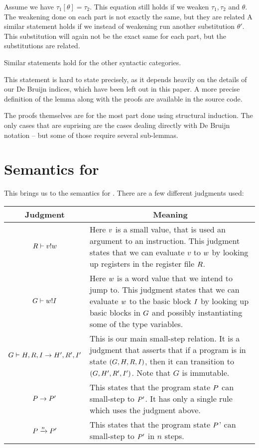 \begin{lemma}
  Assume we have $\tau_1[\theta] = \tau_2$. This equation still holds if we
  weaken $\tau_1, \tau_2$ and $\theta$. The weakening done on each part is not
  exactly the same, but they are related A similar statement holds if we instead
  of weakening run another substitution $\theta'$. This substitution will again
  not be the exact same for each part, but the substitutions are related.

  Similar statements hold for the other syntactic categories.
\end{lemma}

This statement is hard to state precisely, as it depends heavily on the details
of our De Bruijn indices, which have been left out in this paper. A more precise
definition of the lemma along with the proofs are available in the source code.

The proofs themselves are for the most part done using structural induction. The
only cases that are suprising are the cases dealing directly with De Bruijn
notation -- but some of those require several sub-lemmas.

\section{Semantics for \ATAL}

This brings us to the semantics for \ATAL. There are a few different judgments
used:

\begin{tabular}{|c|p{7.5 cm}|}
  \hline
  Judgment & \multicolumn{1}{|c|}{Meaning} \\\hline
  ${R} |- {v} ! {w}$ & Here $v$ is a small value, that is used an argument to an instruction. This judgment states that we can evaluate $v$ to $w$ by looking up registers in the register file $R$. \\\hline
  ${G} |- {w} ! {I}$ & Here $w$ is a word value that we intend to jump to. This judgment states that we can evaluate $w$ to the basic block $I$ by looking up basic blocks in $G$ and possibly instantiating some of the type variables. \\\hline
  ${G} |- {H, R, I} -> {H', R', I'}$ & This is our main small-step relation. It is a judgment that asserts that if a program is in state $(G, H, R, I)$, then it can transition to $(G, H', R', I')$. Note that $G$ is immutable. \\\hline
  ${P} -> {P'}$ & This states that the program state $P$ can small-step to $P'$. It has only a single rule which uses the judgment above. \\\hline
  ${P} \xrightarrow{n} {P'}$ & This states that the program state $P$' can small-step to $P'$ in $n$ steps. \\\hline
\end{tabular} \\

